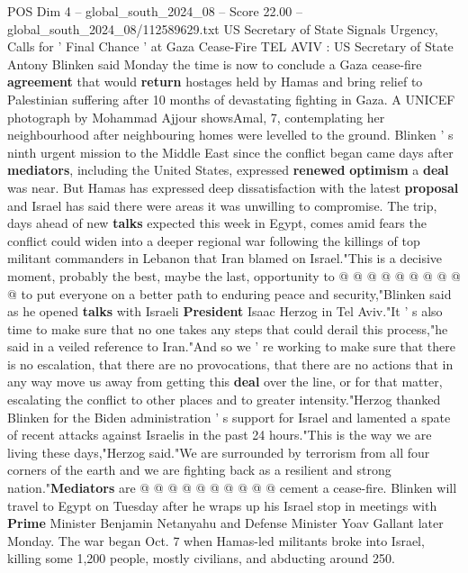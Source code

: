 \begin{textsample}{POS Dim 4 – global\_south\_2024\_08 – Score 22.00 – global\_south\_2024\_08/112589629.txt}  \label{ex:f4_pos_130}
US Secretary of State Signals Urgency, Calls for ' Final Chance ' at Gaza Cease-Fire TEL AVIV : US Secretary of State Antony Blinken said Monday the time is now to conclude a Gaza cease-fire \textbf{agreement} that would \textbf{return} hostages held by Hamas and bring relief to Palestinian suffering after 10 months of devastating fighting in Gaza.
A UNICEF photograph by Mohammad Ajjour showsAmal, 7, contemplating her neighbourhood after neighbouring homes were levelled to the ground.
Blinken ' s ninth urgent mission to the Middle East since the conflict began came days after \textbf{mediators}, including the United States, expressed \textbf{renewed} \textbf{optimism} a \textbf{deal} was near.
But Hamas has expressed deep dissatisfaction with the latest \textbf{proposal} and Israel has said there were areas it was unwilling to compromise.
The trip, days ahead of new \textbf{talks} expected this week in Egypt, comes amid fears the conflict could widen into a deeper regional war following the killings of top militant commanders in Lebanon that Iran blamed on Israel."This is a decisive moment, probably the best, maybe the last, opportunity to @ @ @ @ @ @ @ @ @ @ to put everyone on a better path to enduring peace and security,"Blinken said as he opened \textbf{talks} with Israeli \textbf{President} Isaac Herzog in Tel Aviv."It ' s also time to make sure that no one takes any steps that could derail this process,"he said in a veiled reference to Iran."And so we ' re working to make sure that there is no escalation, that there are no provocations, that there are no actions that in any way move us away from getting this \textbf{deal} over the line, or for that matter, escalating the conflict to other places and to greater intensity."Herzog thanked Blinken for the Biden administration ' s support for Israel and lamented a spate of recent attacks against Israelis in the past 24 hours."This is the way we are living these days,"Herzog said."We are surrounded by terrorism from all four corners of the earth and we are fighting back as a resilient and strong nation."\textbf{Mediators} are @ @ @ @ @ @ @ @ @ @ cement a cease-fire.
Blinken will travel to Egypt on Tuesday after he wraps up his Israel stop in meetings with \textbf{Prime} Minister Benjamin Netanyahu and Defense Minister Yoav Gallant later Monday.
The war began Oct. 7 when Hamas-led militants broke into Israel, killing some 1,200 people, mostly civilians, and abducting around 250.

\end{textsample}
